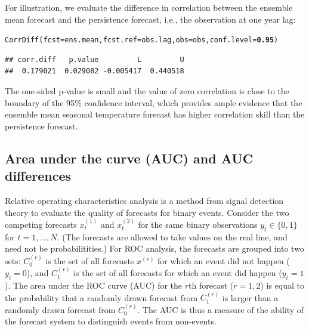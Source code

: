 \documentclass[10pt]{article}\usepackage[]{graphicx}\usepackage[]{color}
\makeatletter
\newcommand{\hlnum}[1]{\textcolor[rgb]{0.502,0,0.502}{\textbf{#1}}}%
\newcommand{\hlstd}[1]{\textcolor[rgb]{0,0,0}{#1}}%
\newcommand{\hlkwc}[1]{\textcolor[rgb]{0,0.502,0.753}{#1}}%
\newcommand{\hlkwd}[1]{\textcolor[rgb]{0,0.267,0.4}{#1}}%
\newenvironment{kframe}{%
 \def\at@end@of@kframe{}%
 \ifinner\ifhmode%
  \def\at@end@of@kframe{\end{minipage}}%
  \begin{minipage}{\columnwidth}%
 \fi\fi%
 \def\FrameCommand##1{\hskip\@totalleftmargin \hskip-\fboxsep
 \colorbox{shadecolor}{##1}\hskip-\fboxsep
     \hskip-\linewidth \hskip-\@totalleftmargin \hskip\columnwidth}%
 \MakeFramed {\advance\hsize-\width
   \@totalleftmargin\z@ \linewidth\hsize
   \@setminipage}}%
 {\par\unskip\endMakeFramed%
 \at@end@of@kframe}
\newenvironment{knitrout}{}{} %
\makeatother
\begin{document}
For illustration, we evaluate the difference in correlation between the ensemble mean forecast and the persistence forecast, i.e., the observation at one year lag:
%
\begin{knitrout}
\color{fgcolor}\begin{kframe}
\begin{alltt}
\hlkwd{CorrDiff}\hlstd{(}\hlkwc{fcst}\hlstd{=ens.mean,} \hlkwc{fcst.ref}\hlstd{=obs.lag,} \hlkwc{obs}\hlstd{=obs,} \hlkwc{conf.level}\hlstd{=}\hlnum{0.95}\hlstd{)}
\end{alltt}
\begin{verbatim}
## corr.diff   p.value         L         U 
##  0.179021  0.029082 -0.005417  0.440518
\end{verbatim}
\end{kframe}
\end{knitrout}
%
The one-sided p-value is small and the value of zero correlation is close to the boundary of the 95\% confidence interval, which provides ample evidence that the ensemble mean seasonal temperature forecast has higher correlation skill than the persistence forecast.


\subsection{Area under the curve (AUC) and AUC differences}

Relative operating characteristics \citep[ROC, ][]{mason2002areas} analysis is a method from signal detection theory to evaluate the quality of forecasts for binary events.
Consider the two competing forecasts $x^{(1)}_t$ and $x^{(2)}_t$ for the same binary observations $y_t \in \{0, 1\}$ for $t=1,\dots,N$.
(The forecasts are allowed to take values on the real line, and need not be probabilitities.)
For ROC analysis, the forecasts are grouped into two sets: $C^{(r)}_0$ is the set of all forecasts $x^{(r)}$ for which an event did not happen ($y_t=0$), and $C^{(r)}_1$ is the set of all forecasts for which an event did happen ($y_t = 1$).
The area under the ROC curve (AUC) for the $r$th forecast ($r=1,2$) is equal to the probability that a randomly drawn forecast from $C^{(r)}_1$ is larger than a randomly drawn forecast from $C^{(r)}_0$.
The AUC is thus a measure of the ability of the forecast system to distinguish events from non-events.
\end{document}
